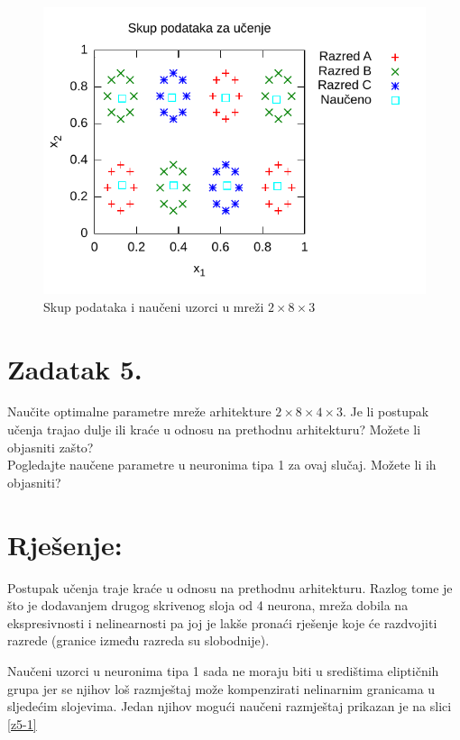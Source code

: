 \documentclass{article}
\begin{document}
\begin{figure}
    \centering
    \includegraphics{img/task4-plot.pdf}
    \caption{Skup podataka i naučeni uzorci u mreži
    $ 2 \times 8 \times 3 $}
    \label{z4-2}
\end{figure}

\pagebreak

\section*{Zadatak 5.}
Naučite optimalne parametre mreže arhitekture
$ 2 \times 8 \times 4 \times 3 $. Je li postupak učenja
trajao dulje ili kraće u odnosu na prethodnu arhitekturu?
Možete li objasniti zašto?\\
Pogledajte naučene parametre u neuronima tipa 1 za ovaj
slučaj. Možete li ih objasniti?

\section*{Rješenje:}
Postupak učenja traje kraće u odnosu na prethodnu
arhitekturu. Razlog tome je što je dodavanjem drugog
skrivenog sloja od 4 neurona, mreža dobila na ekspresivnosti
i nelinearnosti pa joj je lakše pronaći rješenje koje će
razdvojiti razrede (granice između razreda su slobodnije).

Naučeni uzorci u neuronima tipa 1 sada ne moraju biti u
središtima eliptičnih grupa jer se njihov loš razmještaj
može kompenzirati nelinarnim granicama u sljedećim slojevima.
Jedan njihov mogući naučeni razmještaj prikazan je na slici
\ref{z5-1}
\end{document}
